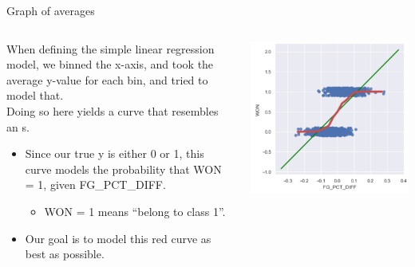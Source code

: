 \documentclass[aspectratio=169]{../latex_main/tntbeamer}  %
\begin{document}
	
		\begin{frame}{Graph of averages}
	    \begin{columns}
	        \begin{column}{.5\textwidth}
	                When defining the simple linear regression model, we binned the x-axis, and took the average y-value for each bin, and tried to model that.\\
	                \bigskip
	                Doing so here yields a curve that resembles an s.
	                \begin{itemize}
	                    \item Since our true y is either 0 or 1, this curve models the probability that WON = 1, given FG\_PCT\_DIFF.
	                    \begin{itemize}
	                        \item WON = 1 means “belong to class 1”.
	                    \end{itemize}
	                    \item Our goal is to model this red curve as best as possible.
	                \end{itemize}
	        \end{column}
	        
	        \begin{column}{.4\textwidth}

	                    \includegraphics[scale=.5]{Bild5}
	        \end{column}
	    \end{columns}
	\end{frame}
	
\end{document}
